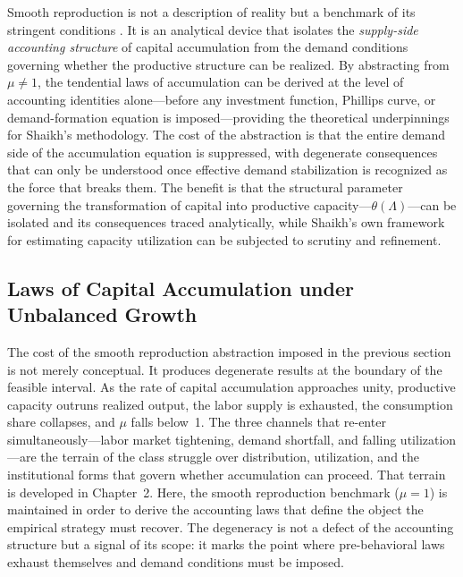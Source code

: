 Smooth reproduction is not a description of reality but a benchmark of its stringent conditions \citep{Okishio2022}. It is an analytical device that isolates the \textit{supply-side accounting structure} of capital accumulation from the demand conditions governing whether the productive structure can be realized. By abstracting from $\mu \neq 1$, the tendential laws of accumulation can be derived at the level of accounting identities alone---before any investment function, Phillips curve, or demand-formation equation is imposed---providing the theoretical underpinnings for Shaikh's methodology. The cost of the abstraction is that the entire demand side of the accumulation equation is suppressed, with degenerate consequences that can only be understood once effective demand stabilization is recognized as the force that breaks them. The benefit is that the structural parameter governing the transformation of capital into productive capacity---$\theta(\Lambda)$---can be isolated and its consequences traced analytically, while Shaikh's own framework for estimating capacity utilization can be subjected to scrutiny and refinement.



\subsection{Laws of Capital Accumulation under Unbalanced Growth}
\label{sec:accounting_laws}

The cost of the smooth reproduction abstraction imposed in the previous section is not merely conceptual. It produces degenerate results at the boundary of the feasible interval. As the rate of capital accumulation approaches unity, productive capacity outruns realized output, the labor supply is exhausted, the consumption share collapses, and $\mu$ falls below~1. The three channels that re-enter simultaneously---labor market tightening, demand shortfall, and falling utilization---are the terrain of the class struggle over distribution, utilization, and the institutional forms that govern whether accumulation can proceed. That terrain is developed in Chapter~2. Here, the smooth reproduction benchmark ($\mu = 1$) is maintained in order to derive the accounting laws that define the object the empirical strategy must recover. The degeneracy is not a defect of the accounting structure but a signal of its scope: it marks the point where pre-behavioral laws exhaust themselves and demand conditions must be imposed.


